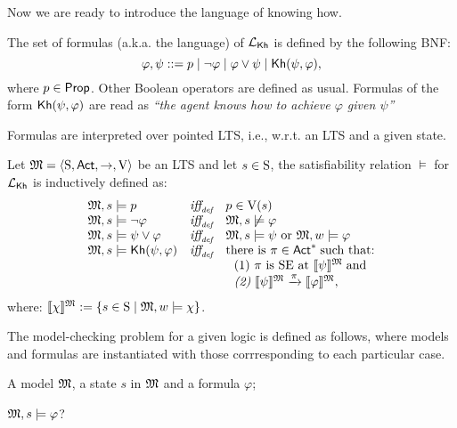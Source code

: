 Now we are ready to introduce the language of knowing how.

\begin{definition}
    \label{def:syntax}
    The set of formulas (a.k.a. the language) of $\Khlogic$ is defined by the following BNF:
    \[
        \varphi, \psi ::= p \mid \neg \varphi \mid \varphi \vee \psi \mid \kh(\psi,\varphi),
    \]
    where $p\in\Prop$. Other Boolean operators are defined as usual. Formulas of the form $\kh(\psi,\varphi)$ are read as \emph{``the agent knows how to achieve $\varphi$ given $\psi$''}
\end{definition}

Formulas are interpreted over pointed LTS, i.e., w.r.t. an LTS and a given state. 

\begin{definition} \label{def:semantics-kh}
    Let $\model = \tup{\S,\Act,\ra,\V}$ be an LTS and let $s\in\S$, the satisfiability relation $\models$ for $\Khlogic$ is inductively defined as:
    \[
    \begin{array}{l@{\ \ \ }c@{\ \ \  }l}
    \model, s \models p & \iffdef & p \in \V(s) \\
    \model, s\models \neg\varphi & \iffdef & \model, s \not\models \varphi \\
    \model, s \models \psi\vee\varphi & \iffdef & \model, s \models \psi \mbox{ or }\model, w \models \varphi \\
    \model, s \models \kh(\psi,\varphi) & \iffdef & \text{there is } \plan \in \Act^* \;\text{such that:} \\
    & & \ \ \text{\rm (1)} \ \plan \text{ is SE at }  \truthset{\model}{\psi}\; \text{and} \\
    & & \ \ \text{\em (2)} \ \truthset{\model}{\psi} \reach{\plan} \truthset{\model}{\varphi}, 
    \end{array}
    \]      where: $\truthset{\model}{\chi} := \csetsc{s\in\S}{\model,w\models\chi}$. 
\end{definition}

The model-checking problem for a given logic is defined as follows, where models and formulas are instantiated with those corrresponding to each particular case. 

\begin{description} \itemsep 0cm
    \item[Input:] A model $\model$, a state $s$ in $\model$ and a formula $\varphi$;
    \item[Output:] $\model,s\models\varphi$?
\end{description}

